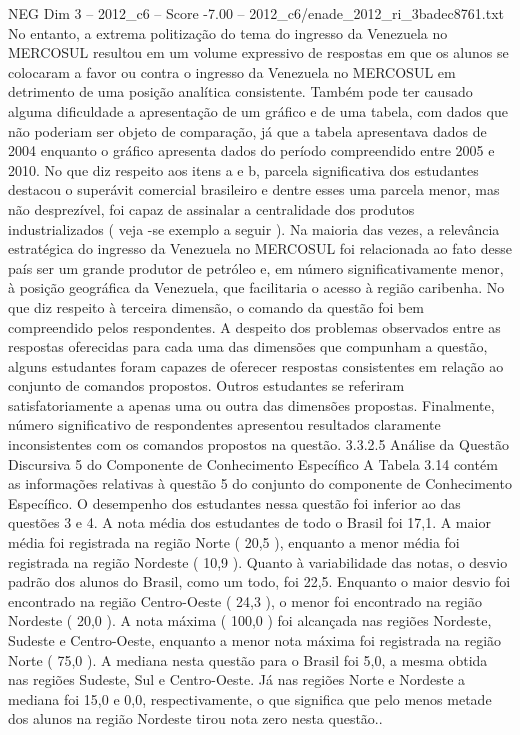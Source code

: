 \begin{textsample}{NEG Dim 3 – 2012\_c6 – Score -7.00 – 2012\_c6/enade\_2012\_ri\_3badec8761.txt}
No entanto, a extrema politização do tema do ingresso da Venezuela no MERCOSUL resultou em um volume expressivo de respostas em que os alunos se colocaram a favor ou contra o ingresso da Venezuela no MERCOSUL em detrimento de uma posição analítica consistente.
Também pode ter causado alguma dificuldade a apresentação de um gráfico e de uma tabela, com dados que não poderiam ser objeto de comparação, já que a tabela apresentava dados de 2004 enquanto o gráfico apresenta dados do período compreendido entre 2005 e 2010.
No que diz respeito aos itens a e b, parcela significativa dos estudantes destacou o superávit comercial brasileiro e dentre esses uma parcela menor, mas não desprezível, foi capaz de assinalar a centralidade dos produtos industrializados ( veja -se exemplo a seguir ).
Na maioria das vezes, a relevância estratégica do ingresso da Venezuela no MERCOSUL foi relacionada ao fato desse país ser um grande produtor de petróleo e, em número significativamente menor, à posição geográfica da Venezuela, que facilitaria o acesso à região caribenha.
No que diz respeito à terceira dimensão, o comando da questão foi bem compreendido pelos respondentes.
A despeito dos problemas observados entre as respostas oferecidas para cada uma das dimensões que compunham a questão, alguns estudantes foram capazes de oferecer respostas consistentes em relação ao conjunto de comandos propostos.
Outros estudantes se referiram satisfatoriamente a apenas uma ou outra das dimensões propostas.
Finalmente, número significativo de respondentes apresentou resultados claramente inconsistentes com os comandos propostos na questão. 3.3.2.5 Análise da Questão Discursiva 5 do Componente de Conhecimento Específico A Tabela 3.14 contém as informações relativas à questão 5 do conjunto do componente de Conhecimento Específico.
O desempenho dos estudantes nessa questão foi inferior ao das questões 3 e 4.
A nota média dos estudantes de todo o Brasil foi 17,1.
A maior média foi registrada na região Norte ( 20,5 ), enquanto a menor média foi registrada na região Nordeste ( 10,9 ).
Quanto à variabilidade das notas, o desvio padrão dos alunos do Brasil, como um todo, foi 22,5.
Enquanto o maior desvio foi encontrado na região Centro-Oeste ( 24,3 ), o menor foi encontrado na região Nordeste ( 20,0 ).
A nota máxima ( 100,0 ) foi alcançada nas regiões Nordeste, Sudeste e Centro-Oeste, enquanto a menor nota máxima foi registrada na região Norte ( 75,0 ).
A mediana nesta questão para o Brasil foi 5,0, a mesma obtida nas regiões Sudeste, Sul e Centro-Oeste.
Já nas regiões Norte e Nordeste a mediana foi 15,0 e 0,0, respectivamente, o que significa que pelo menos metade dos alunos na região Nordeste tirou nota zero nesta questão..

\end{textsample}
